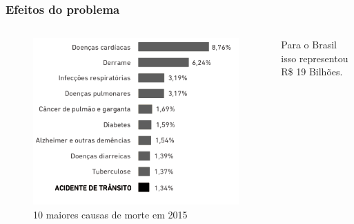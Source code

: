 \begin{frame}
	\frametitle{Efeitos do problema}
	\begin{columns}
		\begin{column}{0.5\textwidth}
			\begin{figure}[h]
				\caption{10 maiores causas de morte em 2015}
				\centering
				\includegraphics[width=1\textwidth]{imagens/acidente-transito}
			\end{figure}
		\end{column}
		\begin{column}{0.5\textwidth} 
			Para o Brasil isso representou R\$ 19 Bilhões\cite{ambev}.
		\end{column}
	\end{columns}	
\end{frame}